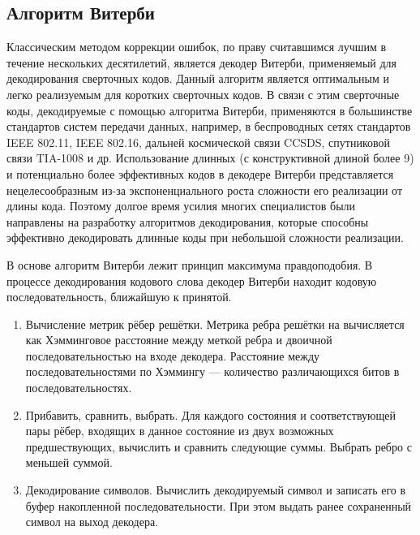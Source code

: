 \subsection{Алгоритм Витерби}
Классическим методом коррекции ошибок, по праву считавшимся лучшим в течение нескольких десятилетий, является 
декодер Витерби, применяемый для декодирования сверточных кодов. Данный алгоритм является оптимальным и легко 
реализуемым для коротких сверточных кодов. В связи с этим сверточные коды, декодируемые с помощью алгоритма 
Витерби, применяются в большинстве стандартов систем передачи данных, например, в беспроводных сетях 
стандартов IEEE 802.11, IEEE 802.16, дальней космической связи CCSDS, спутниковой связи TIA-1008 и др. 
Использование длинных (с конструктивной длиной более 9) и потенциально более эффективных кодов в декодере 
Витерби представляется нецелесообразным из-за экспоненциального роста сложности его реализации от длины кода. 
Поэтому долгое время усилия многих специалистов были направлены на разработку алгоритмов декодирования, 
которые способны эффективно декодировать длинные коды при небольшой сложности реализации.

В основе алгоритм Витерби лежит принцип максимума правдоподобия. В процессе декодирования кодового слова
декодер Витерби находит кодовую последовательность, ближайшую к принятой. 

\begin{enumerate}
\item Вычисление метрик рёбер решётки. Метрика ребра решётки на вычисляется как Хэмминговое расстояние
между меткой ребра и двоичной последовательностью на входе декодера. Расстояние между последовательностями
по Хэммингу --- количество различающихся битов в последовательностях.
\item Прибавить, сравнить, выбрать.
Для каждого состояния и соответствующей пары рёбер, входящих в данное состояние из двух возможных
предшествующих, вычислить и сравнить следующие суммы. Выбрать ребро с меньшей суммой.
\item Декодирование символов.
Вычислить декодируемый символ и записать его в буфер накопленной последовательности. При этом выдать
ранее сохраненный символ на выход декодера.
\end{enumerate}


